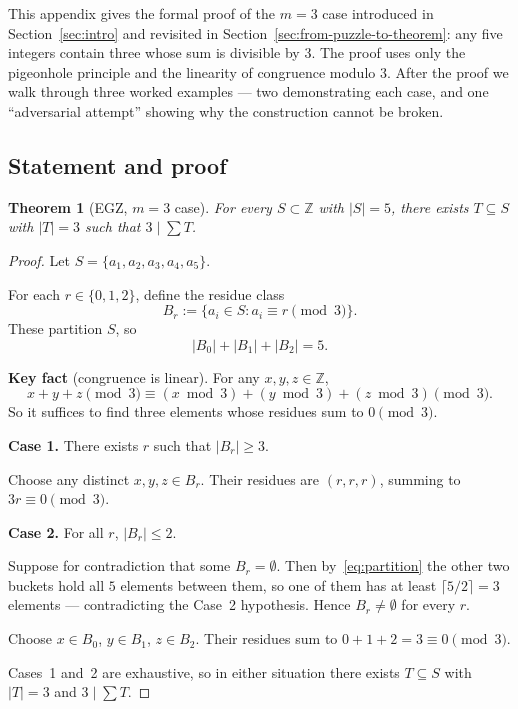 \documentclass[11pt,a4paper]{article}
\theoremstyle{plain}
\newtheorem{theorem}{Theorem}[section]
\theoremstyle{definition}
\theoremstyle{remark}
\newcommand{\Z}{\mathbb{Z}}
\newcommand{\EGZ}{\textsf{EGZ}}
\begin{document}
This appendix gives the formal proof of the $m=3$ case introduced in
Section~\ref{sec:intro} and revisited in
Section~\ref{sec:from-puzzle-to-theorem}: any five integers contain
three whose sum is divisible by $3$. The proof uses only the pigeonhole
principle and the linearity of congruence modulo $3$. After the proof
we walk through three worked examples --- two demonstrating each case,
and one ``adversarial attempt'' showing why the construction cannot be
broken.

\subsection*{Statement and proof}

\begin{theorem}[\EGZ, $m=3$ case]
For every $S \subset \Z$ with $|S| = 5$, there exists $T \subseteq S$ with $|T| = 3$ such that $3 \mid \sum T$.
\end{theorem}

\begin{proof}
Let $S = \{a_1, a_2, a_3, a_4, a_5\}$.

For each $r \in \{0, 1, 2\}$, define the residue class
\[
B_r := \{a_i \in S : a_i \equiv r \pmod{3}\}.
\]
These partition $S$, so
\begin{equation}\label{eq:partition}
|B_0| + |B_1| + |B_2| = 5.
\end{equation}

\textbf{Key fact} (congruence is linear). For any $x, y, z \in \Z$,
\[
x + y + z \pmod{3} \equiv (x \bmod 3) + (y \bmod 3) + (z \bmod 3) \pmod{3}.
\]
So it suffices to find three elements whose residues sum to $0 \pmod 3$.

\textbf{Case 1.} There exists $r$ such that $|B_r| \geq 3$.

Choose any distinct $x, y, z \in B_r$. Their residues are $(r, r, r)$, summing to $3r \equiv 0 \pmod{3}$. \checkmark

\textbf{Case 2.} For all $r$, $|B_r| \leq 2$.

Suppose for contradiction that some $B_r = \emptyset$. Then by~\eqref{eq:partition} the other two buckets hold all $5$ elements between them, so one of them has at least $\lceil 5/2 \rceil = 3$ elements --- contradicting the Case~2 hypothesis. Hence $B_r \neq \emptyset$ for every $r$.

Choose $x \in B_0$, $y \in B_1$, $z \in B_2$. Their residues sum to $0 + 1 + 2 = 3 \equiv 0 \pmod{3}$. \checkmark

Cases~1 and~2 are exhaustive, so in either situation there exists $T \subseteq S$ with $|T| = 3$ and $3 \mid \sum T$.
\end{proof}
\end{document}

